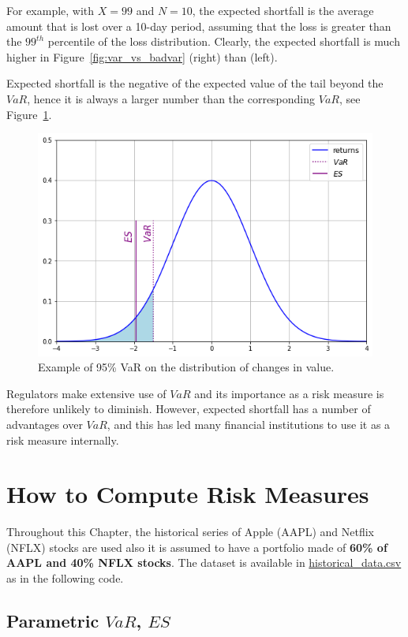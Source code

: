For example, with $X = 99$ and $N = 10$, the expected shortfall is the average amount that is lost over a 10-day period, assuming that the loss is greater than the $99^{th}$ percentile of the loss distribution.  Clearly, the expected shortfall is much higher in Figure~\ref{fig:var_vs_badvar} (right) than (left). 

Expected shortfall is the negative of the expected value of the tail beyond the $VaR$, hence it is always a larger number than the corresponding $VaR$, see Figure~\ref{fig:es_loss}.

\begin{figure}[htb]
\centering
\includegraphics[width=0.6\linewidth]{figures/es}
\caption{Example of 95\% VaR on the distribution of changes in value.}
\label{fig:es_loss}
\end{figure}

Regulators make extensive use of $VaR$ and its importance as a risk measure is therefore unlikely to diminish. However, expected shortfall has a number of advantages over $VaR$, and this has led many financial institutions to use it as a risk measure internally. 

\section{How to Compute Risk Measures}
\label{how-to-estimate-the-var}

Throughout this Chapter, the historical series of Apple (AAPL) and Netflix (NFLX) stocks are used also it is assumed to have a portfolio made of \textbf{60\% of AAPL and 40\% NFLX stocks}. The dataset is available in \href{https://raw.githubusercontent.com/matteosan1/finance_course/master/input_files/historical_data.csv}{historical\_data.csv} as in the following code.

\subsection{Parametric $VaR$, $ES$}

